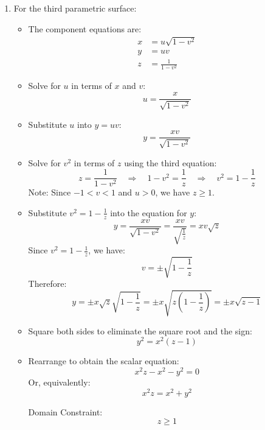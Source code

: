 \begin{example}
\begin{solution}
\begin{enumerate}
\begin{itemize}
       \item Square and add the $x$ and $y$ equations to eliminate $v$:
       \[
       x^2 + y^2 = \sinh^2 u (\cos^2 v + \sin^2 v) = \sinh^2 u
       \]

       \item Use the hyperbolic identity $\cosh^2 u - \sinh^2 u = 1$ to express $\sinh^2 u$ in terms of $z$:
       \[
       x^2 + y^2 = \cosh^2 u - 1 = z^2 - 1
       \]

       \item The scalar equation is:
       \[
       x^2 + y^2 + 1 = z^2
       \]
       The domain constraint is $z \geq 1$ since $u \geq 0$.
   \end{itemize}

\item For the third parametric surface:
   \begin{itemize}
       \item The component equations are:
       \begin{align*}
           x &= u \sqrt{1 - v^2} \\
           y &= u v \\
           z &= \frac{1}{1 - v^2}
       \end{align*}

       \item Solve for $u$ in terms of $x$ and $v$:
       \[
       u = \frac{x}{\sqrt{1 - v^2}}
       \]

       \item Substitute $u$ into $y = u v$:
       \[
       y = \frac{x v}{\sqrt{1 - v^2}}
       \]

       \item Solve for $v^2$ in terms of $z$ using the third equation:
       \[
       z = \frac{1}{1 - v^2} \quad \Rightarrow \quad 1 - v^2 = \frac{1}{z} \quad \Rightarrow \quad v^2 = 1 - \frac{1}{z}
       \]
       Note: Since $-1 < v < 1$ and $u > 0$, we have $z \geq 1$.

       \item Substitute $v^2 = 1 - \frac{1}{z}$ into the equation for $y$:
       \[
       y = \frac{x v}{\sqrt{1 - v^2}} = \frac{x v}{\sqrt{\frac{1}{z}}} = x v \sqrt{z}
       \]
       Since $v^2 = 1 - \frac{1}{z}$, we have:
       \[
       v = \pm \sqrt{1 - \frac{1}{z}}
       \]
       Therefore:
       \[
       y = \pm x \sqrt{z} \sqrt{1 - \frac{1}{z}} = \pm x \sqrt{z \left(1 - \frac{1}{z}\right)} = \pm x \sqrt{z - 1}
       \]

       \item Square both sides to eliminate the square root and the sign:
       \[
       y^2 = x^2 (z - 1)
       \]

       \item Rearrange to obtain the scalar equation:
       \[
       x^2 z - x^2 - y^2 = 0
       \]
       Or, equivalently:
       \[
       x^2 z = x^2 + y^2
       \]
       
       Domain Constraint:
       \[
       z \geq 1
       \]
   \end{itemize}
\end{enumerate}
\end{solution}
\end{example}
